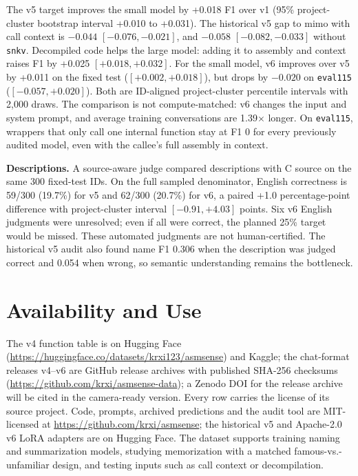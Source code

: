 \documentclass[conference]{IEEEtran}
\begin{document}
The v5 target improves the small model by +0.018 F1 over v1 (95\% project-cluster bootstrap interval +0.010 to +0.031). The historical v5 gap to mimo with call context is $-0.044$ $[-0.076, -0.021]$, and $-0.058$ $[-0.082, -0.033]$ without \texttt{snkv}. Decompiled code helps the large model: adding it to assembly and context raises F1 by +0.025 $[+0.018, +0.032]$. For the small model, v6 improves over v5 by +0.011 on the fixed test ($[+0.002,+0.018]$), but drops by $-0.020$ on \texttt{eval115} ($[-0.057,+0.020]$). Both are ID-aligned project-cluster percentile intervals with 2,000 draws. The comparison is not compute-matched: v6 changes the input and system prompt, and average training conversations are 1.39$\times$ longer. On \texttt{eval115}, wrappers that only call one internal function stay at F1 0 for every previously audited model, even with the callee's full assembly in context.

\textbf{Descriptions.} A source-aware judge compared descriptions with C source on the same 300 fixed-test IDs. On the full sampled denominator, English correctness is 59/300 (19.7\%) for v5 and 62/300 (20.7\%) for v6, a paired +1.0 percentage-point difference with project-cluster interval $[-0.91,+4.03]$ points. Six v6 English judgments were unresolved; even if all were correct, the planned 25\% target would be missed. These automated judgments are not human-certified. The historical v5 audit also found name F1 0.306 when the description was judged correct and 0.054 when wrong, so semantic understanding remains the bottleneck.

\section{Availability and Use}
The v4 function table is on Hugging Face (\url{https://huggingface.co/datasets/krxi123/asmsense}) and Kaggle; the chat-format releases v4--v6 are GitHub release archives with published SHA-256 checksums (\url{https://github.com/krxi/asmsense-data}); a Zenodo DOI for the release archive will be cited in the camera-ready version. Every row carries the license of its source project. Code, prompts, archived predictions and the audit tool are MIT-licensed at \url{https://github.com/krxi/asmsense}; the historical v5 and Apache-2.0 v6 LoRA adapters are on Hugging Face. The dataset supports training naming and summarization models, studying memorization with a matched famous-vs.-unfamiliar design, and testing inputs such as call context or decompilation.
\end{document}
